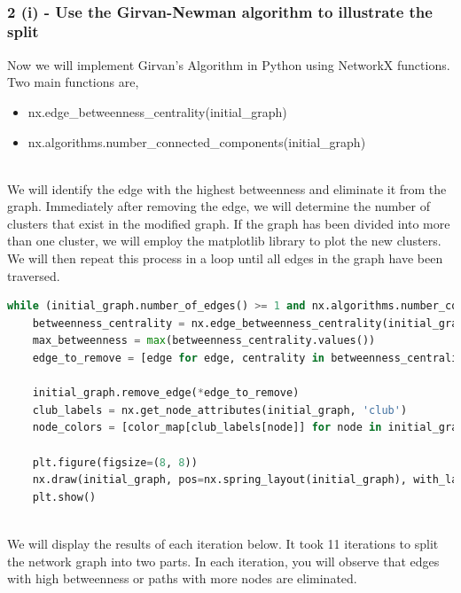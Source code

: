 \documentclass[12pt]{article}
\begin{document}
\clearpage

\\ 


\subsubsection*{2 (i) - Use the Girvan-Newman algorithm to illustrate the split}

Now we will implement Girvan's Algorithm in Python using NetworkX functions. Two main functions are, 

\begin{itemize}
    \item nx.edge\_betweenness\_centrality(initial\_graph)
    \item nx.algorithms.number\_connected\_components(initial\_graph)
\end{itemize}
\\

We will identify the edge with the highest betweenness and eliminate it from the graph. Immediately after removing the edge, we will determine the number of clusters that exist in the modified graph. If the graph has been divided into more than one cluster, we will employ the matplotlib library to plot the new clusters. We will then repeat this process in a loop until all edges in the graph have been traversed.
\\
\begin{lstlisting}[language=Python, caption=Code implementation of the Girvan-Newman algorithm.]
while (initial_graph.number_of_edges() >= 1 and nx.algorithms.number_connected_components(initial_graph) < target_cluster_count):
    betweenness_centrality = nx.edge_betweenness_centrality(initial_graph)
    max_betweenness = max(betweenness_centrality.values())
    edge_to_remove = [edge for edge, centrality in betweenness_centrality.items() if centrality == max_betweenness][0]

    initial_graph.remove_edge(*edge_to_remove)
    club_labels = nx.get_node_attributes(initial_graph, 'club')
    node_colors = [color_map[club_labels[node]] for node in initial_graph.nodes()]

    plt.figure(figsize=(8, 8))
    nx.draw(initial_graph, pos=nx.spring_layout(initial_graph), with_labels=True, node_color=node_colors, node_size=400)
    plt.show()
    
\end{lstlisting} 

We will display the results of each iteration below. It took 11 iterations to split the network graph into two parts. In each iteration, you will observe that edges with high betweenness or paths with more nodes are eliminated.
\end{document}
